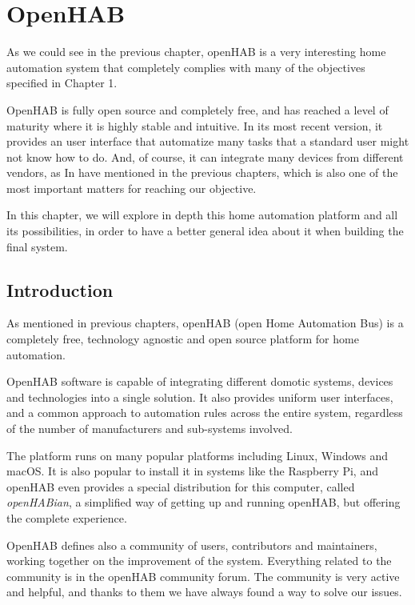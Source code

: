 \chapter{OpenHAB}

As we could see in the previous chapter, openHAB is a very interesting home automation system that completely complies with many 
of the objectives specified in Chapter 1.

OpenHAB is fully open source and completely free, and has reached a level of maturity where it is highly stable and intuitive. In its
most recent version, it provides an user interface that automatize many tasks that a standard user might not know how to do. And,
of course, it can integrate many devices from different vendors, as In have mentioned in the previous chapters, which is also one of
the most important matters for reaching our objective.

In this chapter, we will explore in depth this home automation platform and all its possibilities, in order to have a better general idea
about it when building the final system.

\section{Introduction}
As mentioned in previous chapters, openHAB (open Home Automation Bus) is a completely free, technology agnostic and open
source platform for home automation.

OpenHAB software is capable of integrating different domotic systems, devices and technologies into a single solution. It also
provides uniform user interfaces, and a common approach to automation rules across the entire system, regardless of the number
of manufacturers and sub-systems involved.\cite{openHABDocs}

The platform runs on many popular platforms including Linux, Windows and macOS. It is also popular to install it in systems like the
Raspberry Pi, and openHAB even provides a special distribution for this computer, called \textit{openHABian}, a simplified way of
getting up and running openHAB, but offering the complete experience.

OpenHAB defines also a community of users, contributors and maintainers, working together on the improvement of the system.
Everything related to the community is in the openHAB community forum. The community is very active and helpful, and thanks
to them we have always found a way to solve our issues.


